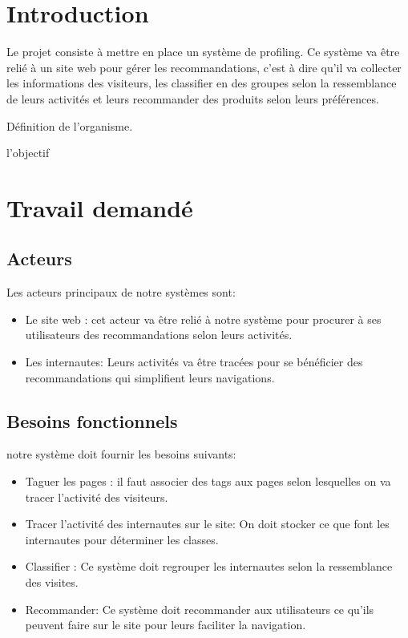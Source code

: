 \newpage
\thispagestyle{empty}


\section{Introduction}

Le projet consiste à mettre en place un système de profiling. Ce système va être relié à un site web pour gérer les recommandations, c'est à dire qu'il va collecter les informations des visiteurs, les classifier en des groupes selon la ressemblance de leurs activités et leurs recommander des produits selon leurs préférences.

Définition de l'organisme.

l'objectif

\section{Travail demandé}

\subsection{Acteurs}

Les acteurs principaux de notre systèmes sont:


\begin{itemize}
    \item Le site web : cet acteur va être relié à notre système pour procurer à ses utilisateurs des recommandations selon leurs activités.
    
    \item Les internautes: Leurs activités va être tracées pour se bénéficier des recommandations qui simplifient leurs navigations.
\end{itemize}

\subsection{Besoins fonctionnels }
notre système doit fournir les besoins suivants:

\begin{itemize}
    \item Taguer les pages : il faut associer des tags aux pages selon lesquelles on va tracer l'activité des visiteurs.
    
    \item Tracer l'activité des internautes sur le site: On doit stocker ce que font les internautes pour déterminer les classes.
    
    \item Classifier : Ce système doit regrouper les internautes selon la ressemblance des visites.
    
    \item Recommander: Ce système doit recommander aux utilisateurs ce qu'ils peuvent faire sur le site pour leurs faciliter la navigation.
\end{itemize}

